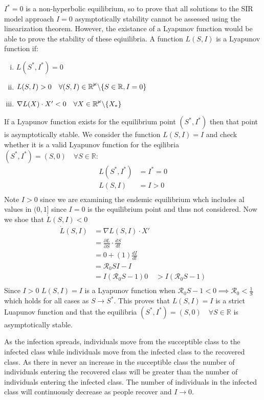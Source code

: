 $I^*=0$ is a non-hyperbolic equilibrium, so to prove that all solutions to the SIR model approach $I=0$ asymptotically stability cannot be assessed using the linearization theorem.
However, the existance of a Lyapunov function would be able to prove the stability of these eqiuilibria.
A function $L(S,I)$ is a Lyapunov function if:
\begin{enumerate}[(i)]
    \item $L(S^*,I^*) = 0$
    \item $L(S,I) > 0 \quad \forall (S,I) \in \mathbb{R^2} \char`\\ \{S \in \mathbb{R},I=0 \}$
    \item $\nabla L(X) \cdot X' < 0 \quad \forall X \in \mathbb{R^2}\char`\\ \{X_*\}$
\end{enumerate}
If a Lyapunov function exists for the equilibrium point $(S^*,I^*)$ then that point is asymptotically stable.
We consider the function $L(S,I) = I$ and check whether it is a valid Lyapunov function for the eqilibria $(S^*,I^*) = (S,0)\quad \forall S \in \mathbb{R}$:
\begin{align*}
    L(S^*,I^*) &= I^* = 0\\
    L(S,I)     &= I > 0\\
\end{align*}
Note $I >0$ since we are examining the endemic equilibrium whch includes al values in $(0,1]$ since $I=0$ is the equilibrium point and thus not considered.
Now we shoe that $\dot{L}(S,I) < 0$
\begin{align*}
    \dot{L}(S,I) &= \nabla L(S,I) \cdot X'\\
                 &= \frac{\partial L}{\partial S}\cdot \frac{dS}{dt}\\
                 & = 0 + (1)\frac{dI}{dt}\\
                 &={\mathcal R_0}SI -I\\
                 &=I({\mathcal R_0}S-1)
    0            &> I({\mathcal R_0}S-1) \label{eq:1}\\
\end{align*}
Since $I > 0$ $L(S,I) = I$ is a Lyapunov function when ${\mathcal R_0}S -1 < 0 \implies {\mathcal R_0} < \frac{1}{S}$ which holds for all cases as $S \to S^*$.
This proves that $L(S,I) = I$ is a strict Luapunov function and that the equilibria $(S^*,I^*) = (S,0)\quad \forall S \in \mathbb{R}$ is asymptotically stable.\par
As the infection spreads, individuals move from the succeptible class to the infected class while individuals move from the infected class to the recovered class.
As there in never an increase in the succeptible class the number of individuals entering the recovered class will be greater than the number of individuals entering the infected class.
The number of individuals in the infected class will continuously decrease as people recover and $I \to 0$.
